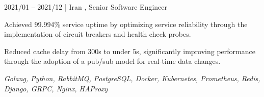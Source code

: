     \begin{twocolentry}{2021/01 -- 2021/12 | Iran}
        , Senior Software Engineer
    \end{twocolentry}
    \begin{onecolentry}
        \begin{highlights}
            \item Achieved 99.994\% service uptime by optimizing service reliability through the implementation of circuit breakers and health check probes.
            \item Reduced cache delay from 300s to under 5s, significantly improving performance through the adoption of a pub/sub model for real-time data changes.
        \end{highlights}
        \textit{Golang, Python, RabbitMQ, PostgreSQL, Docker, Kubernetes, Prometheus, Redis, Django, GRPC, Nginx, HAProxy}
    \end{onecolentry}
    \vspace{0.3cm}


